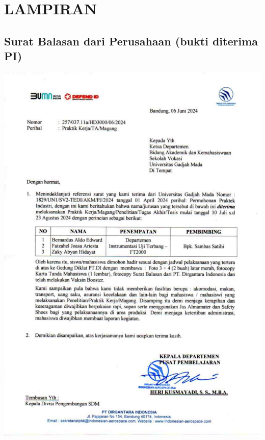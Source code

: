 \appendix
\chapter*{LAMPIRAN}
\setcounter{section}{0} %
\setcounter{page}{1}

\renewcommand{\thesection}{\Alph{section}}
\renewcommand{\thesubsection}{\Alph{section}.\arabic{subsection}\hspace{-0.25cm}}
\renewcommand{\thepage}{L - \arabic{page}}


%
%
%
%
%


\section{Surat Balasan dari Perusahaan (bukti diterima PI)}
\includegraphics[scale=0.7]{dokumen/magang-ptdi.pdf}

